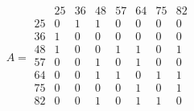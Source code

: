 \documentclass{article}
\begin{document}
\begin{equation*}
A = \begin{array}{c|ccccccc}
   & 25 & 36 & 48 & 57 & 64 & 75 & 82 \\
\hline
25 & 0 & 1 & 1 & 0 & 0 & 0 & 0 \\
36 & 1 & 0 & 0 & 0 & 0 & 0 & 0 \\
48 & 1 & 0 & 0 & 1 & 1 & 0 & 1 \\
57 & 0 & 0 & 1 & 0 & 1 & 0 & 0 \\
64 & 0 & 0 & 1 & 1 & 0 & 1 & 1 \\
75 & 0 & 0 & 0 & 0 & 1 & 0 & 1 \\
82 & 0 & 0 & 1 & 0 & 1 & 1 & 0 \\
\end{array}
\end{equation*}
\end{document}
